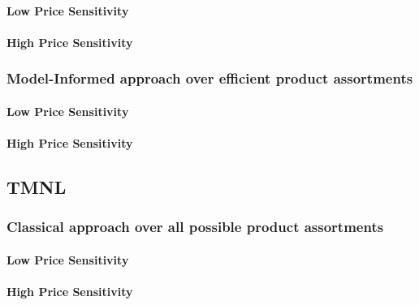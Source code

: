 \paragraph{Low Price Sensitivity}



\paragraph{High Price Sensitivity}



\subsubsection{Model-Informed approach over efficient product assortments}

\paragraph{Low Price Sensitivity}



\paragraph{High Price Sensitivity}



\subsection{TMNL}

\subsubsection{Classical approach over all possible product assortments}

\paragraph{Low Price Sensitivity}



\paragraph{High Price Sensitivity}

